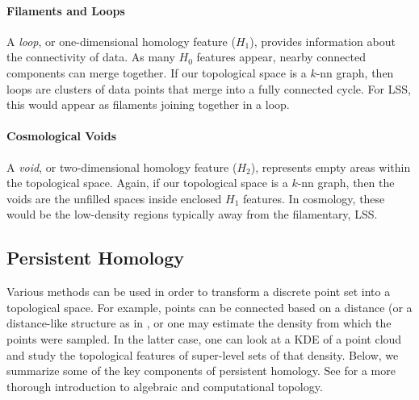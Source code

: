\documentclass[12pt]{article}
\begin{document}
\paragraph{Filaments and Loops} A \emph{loop}, or one-dimensional homology feature ($H_1$), provides information about the connectivity of data. As many $H_0$ features appear, nearby connected components can merge together. If our topological space is a $k$-nn graph, then loops are clusters of data points that merge into a fully connected cycle. For LSS, this would appear as filaments joining together in a loop.


\paragraph{Cosmological Voids}  A \emph{void}, or two-dimensional homology feature ($H_2$), represents empty areas within the topological space. Again, if our topological space is a $k$-nn graph, then the voids are the unfilled spaces inside enclosed $H_1$ features.  In cosmology, these would be the low-density regions typically away from the filamentary, LSS.

\subsection{Persistent Homology}
Various methods can be used in order to transform a discrete point set into a topological space. For example, points can be connected based on a distance (or
a distance-like structure as in \citep{chazal2011geometric}, or one may estimate the density from which the points were sampled. In the latter case, one can look at a KDE of a point cloud and study the topological features of super-level sets of that density. Below, we summarize some of the key components of persistent homology. See \citep{edelsbrunner2010computational,hatcher2002algebraic,munkres1984elements} for a more thorough introduction to algebraic and computational topology.
\end{document}

